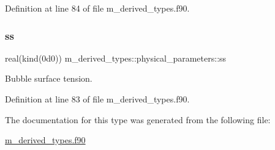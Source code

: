 Definition at line 84 of file m\+\_\+derived\+\_\+types.\+f90.

\mbox{\label{structm__derived__types_1_1physical__parameters_aabd7a1fe772c4e9a6e2f108266ebd94e}} 
\subsubsection{\texorpdfstring{ss}{ss}}
{\footnotesize\ttfamily real(kind(0d0)) m\+\_\+derived\+\_\+types\+::physical\+\_\+parameters\+::ss}



Bubble surface tension. 



Definition at line 83 of file m\+\_\+derived\+\_\+types.\+f90.



The documentation for this type was generated from the following file\+:\begin{DoxyCompactItemize}
\item 
\hyperlink{m__derived__types_8f90}{m\+\_\+derived\+\_\+types.\+f90}\end{DoxyCompactItemize}
